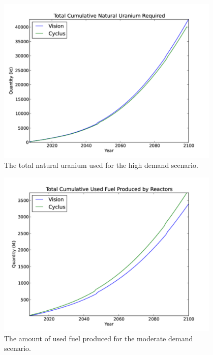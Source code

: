 \begin{figure}
\begin{center}
  \includegraphics[height=8cm]{./figs/nat_u_high.pdf}
  \caption{The total natural uranium used for the high demand scenario.}
  \label{fig:nat_u_high}
\end{center}  
\end{figure}

\begin{figure}
  \begin{center}
    \includegraphics[height=8cm]{./figs/used_fuel_low.pdf}
    \caption{The amount of used fuel produced for the moderate demand scenario.}
    \label{fig:used_fuel_low}
  \end{center}  
\end{figure}

